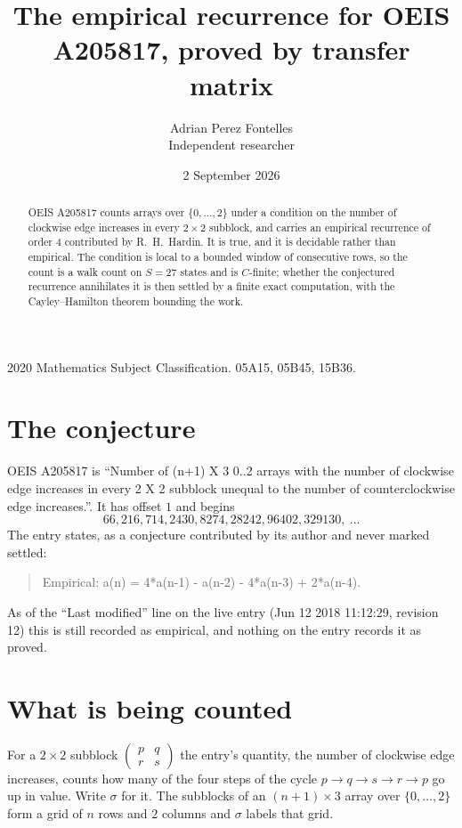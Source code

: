\documentclass[11pt,a4paper]{article}
\title{The empirical recurrence for OEIS A205817, proved by transfer matrix}
\author{Adrian Perez Fontelles\\ \small Independent researcher}
\date{2 September 2026}
\theoremstyle{plain}
\theoremstyle{definition}
\begin{document}
\maketitle

\begin{abstract}
OEIS A205817 counts arrays over $\{0,\dots,2\}$ under a condition on the number of clockwise edge increases
in every $2\times2$ subblock, and carries an empirical recurrence of order $4$ contributed by
R.~H.~Hardin. It is true, and it is decidable rather than empirical. The condition is local to
a bounded window of consecutive rows, so the count is a walk count on $S=27$ states and is
$C$-finite; whether the conjectured recurrence annihilates it is then settled by a finite exact
computation, with the Cayley--Hamilton theorem bounding the work.
\end{abstract}

\noindent\small 2020 Mathematics Subject Classification. 05A15, 05B45, 15B36.\normalsize

\section{The conjecture}

OEIS A205817 is ``Number of (n+1) X 3 0..2 arrays with the number of clockwise edge increases in every 2 X 2 subblock unequal to the number of counterclockwise edge increases.''. It has offset $1$ and begins
\[
66, 216, 714, 2430, 8274, 28242, 96402, 329130,\ \dots
\]
The entry states, as a conjecture contributed by its author and never marked settled:
\begin{quote}
Empirical: a(n) = 4*a(n-1) - a(n-2) - 4*a(n-3) + 2*a(n-4).
\end{quote}
As of the ``Last modified'' line on the live entry (Jun 12 2018 11:12:29, revision 12) this is still
recorded as empirical, and nothing on the entry records it as proved.

\section{What is being counted}

For a $2\times2$ subblock $\begin{pmatrix}p&q\\r&s\end{pmatrix}$ the
entry's quantity, the number of clockwise edge increases, counts how many of the four steps of the cycle $p\to q\to s\to r\to p$ go up in value. Write $\sigma$ for it. The subblocks of an
$(n+1)\times3$ array over $\{0,\dots,2\}$ form a grid of $n$ rows and $2$
columns and $\sigma$ labels that grid.
\end{document}
